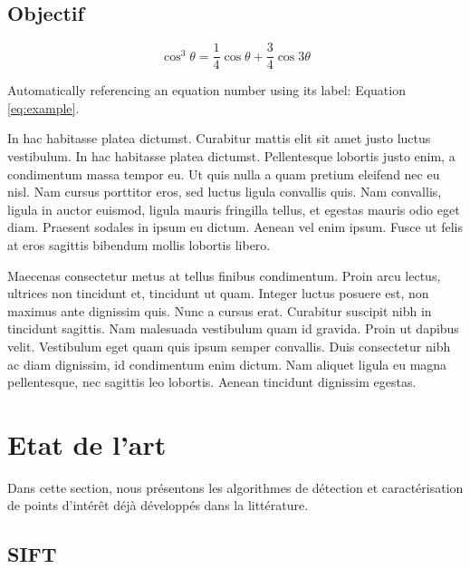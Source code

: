 \documentclass[
	a4paper, %
	10pt, %
	unnumberedsections, %
	twoside, %
]{LTJournalArticle}
\begin{document}
\subsection{Objectif}

\begin{equation}
	\cos^3 \theta =\frac{1}{4}\cos\theta+\frac{3}{4}\cos 3\theta
	\label{eq:example}
\end{equation}

Automatically referencing an equation number using its label: Equation \ref{eq:example}.

In hac habitasse platea dictumst. Curabitur mattis elit sit amet justo luctus vestibulum. In hac habitasse platea dictumst. Pellentesque lobortis justo enim, a condimentum massa tempor eu. Ut quis nulla a quam pretium eleifend nec eu nisl. Nam cursus porttitor eros, sed luctus ligula convallis quis. Nam convallis, ligula in auctor euismod, ligula mauris fringilla tellus, et egestas mauris odio eget diam. Praesent sodales in ipsum eu dictum. Aenean vel enim ipsum. Fusce ut felis at eros sagittis bibendum mollis lobortis libero.

Maecenas consectetur metus at tellus finibus condimentum. Proin arcu lectus, ultrices non tincidunt et, tincidunt ut quam. Integer luctus posuere est, non maximus ante dignissim quis. Nunc a cursus erat. Curabitur suscipit nibh in tincidunt sagittis. Nam malesuada vestibulum quam id gravida. Proin ut dapibus velit. Vestibulum eget quam quis ipsum semper convallis. Duis consectetur nibh ac diam dignissim, id condimentum enim dictum. Nam aliquet ligula eu magna pellentesque, nec sagittis leo lobortis. Aenean tincidunt dignissim egestas.

\section{Etat de l'art}

Dans cette section, nous présentons les algorithmes de détection et caractérisation de points d'intérêt déjà développés dans la littérature.

\subsection{SIFT}
\end{document}
